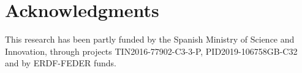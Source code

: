 \section{Acknowledgments}
This research has been partly funded by the Spanish Ministry of Science and Innovation,
through projects TIN2016-77902-C3-3-P, PID2019-106758GB-C32 and by ERDF-FEDER funds.



\address{Inmaculada Pérez-Bernabé\\
  Department of Mathematics\\
  University of Almer\'ia\\
  Almería, 04120, Spain\\
  }

\address{Ana D. Maldonado\\
  Department of Mathematics\\
  University of Almer\'ia\\
  Almería, 04120, Spain\\
  (ORCiD: 0000-0001-8253-2526)\\
  }

\address{Thomas D. Nielsen\\
  Department of Computer Science\\
   Aalborg University\\
  Aalborg, 9220, Denmark\\
  }

\address{Antonio Salmerón\\
	Department of Mathematics and \\
	Center for the Development and Transfer of Mathematical Research to Industry (CDTIME)\\
	University of Almer\'ia\\
	Almería, 04120, Spain\\
	(ORCiD: 0000-0003-4982-8725)\\
	}
